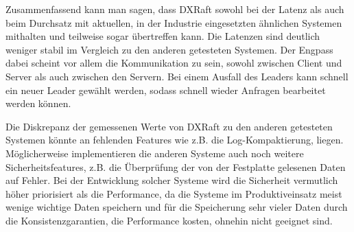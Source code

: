 Zusammenfassend kann man sagen, dass DXRaft sowohl bei der Latenz als auch beim Durchsatz mit aktuellen, in der Industrie eingesetzten ähnlichen Systemen mithalten und teilweise sogar übertreffen kann. Die Latenzen sind deutlich weniger stabil im Vergleich zu den anderen getesteten Systemen. Der Engpass dabei scheint vor allem die Kommunikation zu sein, sowohl zwischen Client und Server als auch zwischen den Servern. Bei einem Ausfall des Leaders kann schnell ein neuer Leader gewählt werden, sodass schnell wieder Anfragen bearbeitet werden können. 

Die Diskrepanz der gemessenen Werte von DXRaft zu den anderen getesteten Systemen könnte an fehlenden Features wie z.B. die Log-Kompaktierung, liegen. Möglicherweise implementieren die anderen Systeme auch noch weitere Sicherheitsfeatures, z.B. die Überprüfung der von der Festplatte gelesenen Daten auf Fehler. Bei der Entwicklung solcher Systeme wird die Sicherheit vermutlich höher priorisiert als die Performance, da die Systeme im Produktiveinsatz meist wenige wichtige Daten speichern und für die Speicherung sehr vieler Daten durch die Konsistenzgarantien, die Performance kosten, ohnehin nicht geeignet sind.


